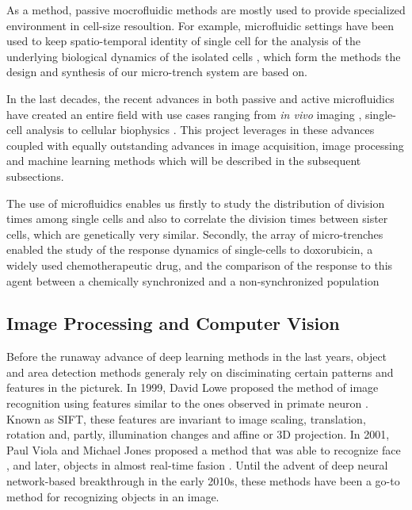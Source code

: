 \documentclass[pdftex,12pt,a4paper]{report}
\begin{document}
As a method, passive mocrofluidic methods are mostly used to provide specialized environment in cell-size resoultion. For example, microfluidic settings have been used to keep spatio-temporal identity of single cell for the analysis of the underlying biological dynamics of the isolated cells \cite{mu2013microfluidics, sekhavati2015marker}, which form the methods the design and synthesis of our micro-trench system are based on.

In the last decades, the recent advances in both passive and active microfluidics have created an entire field \cite{whitesides2006origins} with use cases ranging from \textit{in vivo} imaging \cite{chronis2007microfluidics}, single-cell analysis \cite{wheeler2003microfluidic} to cellular biophysics \cite{di2010bacterial}. This project leverages in these advances coupled with equally outstanding advances in image acquisition, image processing and machine learning methods which will be described in the subsequent subsections.

The use of microfluidics enables us firstly to study the distribution of division times among single cells and also to correlate the division times between sister cells, which are genetically very similar. Secondly, the array of micro-trenches enabled the study of the response dynamics of single-cells to doxorubicin, a widely used chemotherapeutic drug, and the comparison of the response to this agent between a chemically synchronized and a non-synchronized population

\subsection{Image Processing and Computer Vision}
\label{subsection:cv_advances}

Before the runaway advance of deep learning methods in the last years, object and area detection methods generaly rely on disciminating certain patterns and features in the picturek. In 1999, David Lowe proposed the method of image recognition using features similar to the ones observed in primate neuron \cite{lowe1999object}. Known as SIFT, these features are invariant to image scaling, translation, rotation and, partly, illumination changes and affine or 3D projection. In 2001, Paul Viola and Michael Jones proposed a method that was able to recognize face \cite{viola2004robust}, and later, objects in almost real-time fasion \cite{viola2001rapid}. Until the advent of deep neural network-based breakthrough in the early 2010s, these methods have been a go-to method for recognizing objects in an image.
\end{document}
